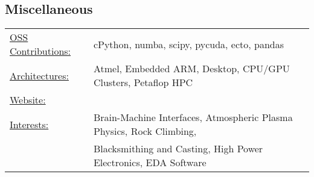 \documentclass{res}
\begin{document}
\begin{resume}
\section{Miscellaneous}
  \begin{tabular}{l p{5.5in}}
    \underline{OSS Contributions:} & cPython, numba, scipy, pycuda, ecto, pandas  \\
    \underline{Architectures:}  & Atmel, Embedded ARM, Desktop, CPU/GPU Clusters, Petaflop HPC \\
    \underline{Website:}    &   \\
    \underline{Interests:}  & Brain-Machine Interfaces, Atmospheric Plasma Physics, Rock Climbing, \\
                            & Blacksmithing and Casting, High Power Electronics, EDA Software
 \end{tabular}

\end{resume}
\end{document}
